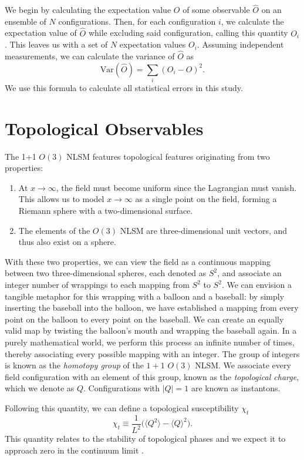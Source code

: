 We begin by calculating the expectation value $O$ of some observable $\hat O$ on an ensemble of $N$ configurations. Then, for each configuration $i$, we calculate the expectation value of $\hat O$ while excluding said configuration, calling this quantity $O_i$. This leaves us with a set of $N$ expectation values $O_i$. Assuming independent measurements, we can calculate the variance of $\hat O$ as
\begin{equation}
    \mathrm{Var}(\hat O) = \sum_{i} \left(O_i - O\right)^2.
\end{equation}
We use this formula to calculate all statistical errors in this study.
\section{Topological Observables}
\label{sec:topological charge}
The 1+1 $O(3)$ NLSM features topological features originating from two properties: 
\begin{enumerate}
    \item At $x\rightarrow\infty$, the field must become uniform since the Lagrangian must vanish. This allows us to model $x\rightarrow\infty$ as a single point on the field, forming a Riemann sphere with a two-dimensional surface.
    \item The elements of the $O(3)$ NLSM are three-dimensional unit vectors, and thus also exist on a sphere. 
\end{enumerate}

With these two properties, we can view the field as a continuous mapping between two three-dimensional spheres, each denoted as $S^2$, and associate an integer number of wrappings to each mapping from $S^2$ to $S^2$. We can envision a tangible metaphor for this wrapping with a balloon and a baseball: by simply inserting the baseball into the balloon, we have established a mapping from every point on the balloon to every point on the baseball. We can create an equally valid map by twisting the balloon's mouth and wrapping the baseball again. In a purely mathematical world, we perform this process an infinite number of times, thereby associating every possible mapping with an integer. The group of integers is known as the \textit{homotopy group} of the $1+1$ $O(3)$ NLSM. We associate every field configuration with an element of this group, known as the \textit{topological charge}, which we denote as $Q$. Configurations with $|Q|=1$ are known as instantons.

Following this quantity, we can define a topological susceptibility $\chi_t$
\begin{equation}
\chi_t \equiv \frac{1}{L^2} \Big( \langle Q^2 \rangle - \langle Q \rangle^2 \Big).
\end{equation}
This quantity relates to the stability of topological phases and we expect it to approach zero in the continuum limit \cite{berg1981}.
